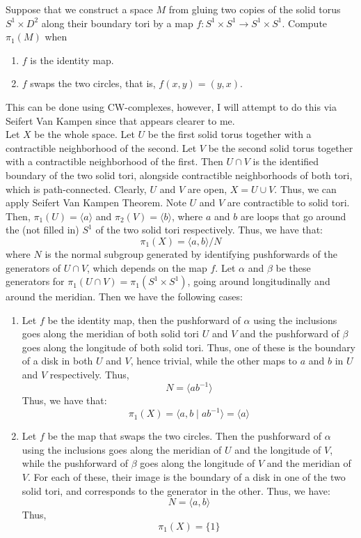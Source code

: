 \documentclass[12pt]{article}
\begin{document}
\begin{problem}{3}
    Suppose that we construct a space $M$ from gluing two copies of the solid torus $S^1 \times D^2$ along their boundary tori by a map $f: S^1 \times S^1 \to S^1 \times S^1$. Compute $\pi_1(M)$ when
    \begin{enumerate}
    \item $f$ is the identity map.
    \item $f$ swaps the two circles, that is, $f(x,y) = (y,x)$. 
    \end{enumerate}
\end{problem}
\begin{solution}
    This can be done using CW-complexes, however, I will attempt to do this via Seifert Van Kampen since that appears clearer to me. \\
    Let $X$ be the whole space. Let $U$ be the first solid torus together with a contractible neighborhood of the second. Let $V$ be the second solid torus together with a contractible neighborhood of the first. Then $U \cap V$ is the identified boundary of the two solid tori, alongside contractible neighborhoods of both tori, which is path-connected. Clearly, $U$ and $V$ are open, $X = U \cup V$. Thus, we can apply Seifert Van Kampen Theorem. \bbni
    Note $U$ and $V$ are contractible to solid tori. Then, $\pi_1(U) = \langle a \rangle$ and $\pi_2(V) = \langle b \rangle$, where $a$ and $b$ are loops that go around the (not filled in) $S^1$ of the two solid tori respectively. Thus, we have that: 
    \[ \pi_1(X) = \langle a, b \rangle / N\]
    where $N$ is the normal subgroup generated by identifying pushforwards of the generators of $U \cap V$, which depends on the map $f$. Let $\alpha$ and $\beta$ be these generators for $\pi_1(U \cap V) = \pi_1(S^1 \times S^1)$, going around longitudinally and around the meridian. Then we have the following cases:
    \begin{enumerate}
        \item Let $f$ be the identity map, then the pushforward of $\alpha$ using the inclusions goes along the meridian of both solid tori $U$ and $V$ and the pushforward of $\beta$ goes along the longitude of both solid tori. Thus, one of these is the boundary of a disk in both $U$ and $V$, hence trivial, while the other maps to $a$ and $b$ in $U$ and $V$ respectively. Thus, 
        \[ N = \langle ab^{-1}\rangle \] 
        Thus, we have that:
        \[ \pi_1(X) = \langle a, b \mid ab^{-1} \rangle = \langle a \rangle \]
        \item Let $f$ be the map that swaps the two circles. Then the pushforward of $\alpha$ using the inclusions goes along the meridian of $U$ and the longitude of $V$, while the pushforward of $\beta$ goes along the longitude of $V$ and the meridian of $V$. For each of these, their image is the boundary of a disk in one of the two solid tori, and corresponds to the generator in the other. Thus, we have: 
        \[ N = \langle a, b \rangle \]
        Thus,
        \[ \pi_1(X) = \{1\}\]
    \end{enumerate}
\end{solution}
\newpage 
\end{document}
